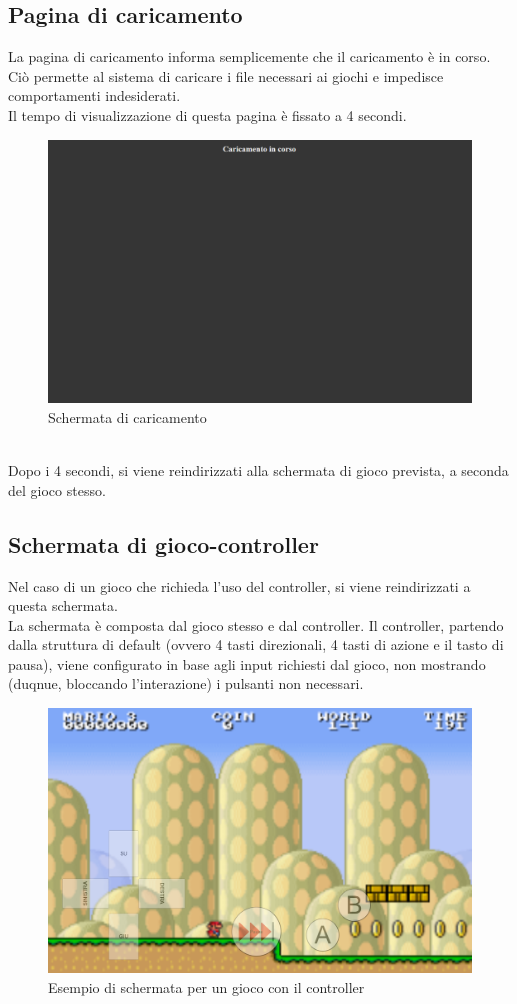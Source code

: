 \subsection{Pagina di caricamento}
La pagina di caricamento informa semplicemente che il caricamento è in corso. Ciò permette al sistema di caricare i file necessari ai giochi e impedisce comportamenti indesiderati.\\
Il tempo di visualizzazione di questa pagina è fissato a 4 secondi.
\begin{figure}[h]
    \centering
    \includegraphics[width=340pt]{schermataCaricamento.png}
    \caption{Schermata di caricamento}
    \label{fig:schermataCaricamento}
\end{figure}
\\Dopo i 4 secondi, si viene reindirizzati alla schermata di gioco prevista, a seconda del gioco stesso.
\newpage
\subsection{Schermata di gioco-controller}
Nel caso di un gioco che richieda l'uso del controller, si viene reindirizzati a questa schermata.\\
La schermata è composta dal gioco stesso e dal controller. Il controller, partendo dalla struttura di default (ovvero 4 tasti direzionali, 4 tasti di azione e il tasto di pausa), viene configurato in base agli input richiesti dal gioco, non mostrando (duqnue, bloccando l'interazione) i pulsanti non necessari.
\begin{figure}[h]
    \centering
    \includegraphics[width=340pt]{schermataGiocoController.png}
    \caption{Esempio di schermata per un gioco con il controller}
    \label{fig:schermataGiocoController}
\end{figure}
\newpage

